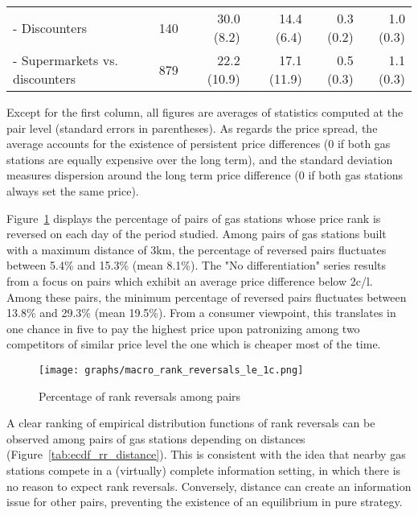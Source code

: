 \documentclass[english]{article}
\begin{document}
\begin{table}
\begin{threeparttable}
\begin{tabular}{lrrrrr}
    - Discounters & 140   & 30.0 (8.2) & 14.4 (6.4) & 0.3 (0.2) & 1.0 (0.3) \\
    - Supermarkets vs. discounters & 879   & 22.2 (10.9) & 17.1 (11.9) & 0.5 (0.3) & 1.1 (0.3) \\
    \bottomrule
    \bottomrule
\end{tabular}
\begin{tablenotes}
			\small
      \item Except for the first column, all figures are averages of statistics computed at the pair level (standard errors in parentheses). As regards the price spread, the average accounts for the existence of persistent price differences (0 if both gas stations are equally expensive over the long term), and the standard deviation measures dispersion around the long term price difference (0 if both gas stations always set the same price).
\end{tablenotes}
\end{threeparttable}
\end{table}

Figure~\ref{fig:pct_reversed_pairs} displays the percentage of pairs of gas stations whose price rank is reversed on each day of the period studied. Among pairs of gas stations built with a maximum distance of 3km, the percentage of reversed pairs fluctuates between 5.4\% and 15.3\%  (mean 8.1\%). The "No differentiation" series results from a focus on pairs which exhibit an average price difference below 2c/l. Among these pairs, the minimum percentage of reversed pairs fluctuates between 13.8\% and 29.3\% (mean 19.5\%). From a consumer viewpoint, this translates in one chance in five to pay the highest price upon patronizing among two competitors of similar price level the one which is cheaper most of the time.

\begin{figure}[htb!]
    \caption{Percentage of rank reversals among pairs}
    \label{fig:pct_reversed_pairs}
	\centering
		\texttt{[image: graphs/macro\_rank\_reversals\_le\_1c.png]}
\end{figure}

A clear ranking of empirical distribution functions of rank reversals can be observed among pairs of gas stations depending on distances (Figure~\ref{tab:ecdf_rr_distance}). This is consistent with the idea that nearby gas stations compete in a (virtually) complete information setting, in which there is no reason to expect rank reversals. Conversely, distance can create an information issue for other pairs, preventing the existence of an equilibrium in pure strategy.
\end{document}

